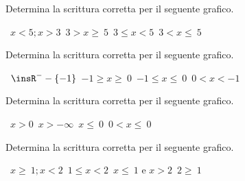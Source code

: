 \begin{esercizio}
 \label{ese:21.4}
 Determina la scrittura corretta per il seguente grafico.
  \begin{center}
  

  \boxA\quad~\(x<5;x>3\)\quad\boxB\quad~\(3>x\ge~5\)\quad\boxC\quad~\(3\le x<5\)\quad\boxD\quad~\(3<x\le~5\)
 \end{center}
  \end{esercizio}

\begin{esercizio}
 \label{ese:21.5}
Determina la scrittura corretta per il seguente grafico.
 \begin{center}
  

  \boxA\quad~\(\insR^{-}-\{-1\}\)\quad\boxB\quad~\(-1\ge x\ge~0\)\quad\boxC\quad~\(-1\le x\le~0\)\quad\boxD\quad~\(0<x<-1\)
 \end{center}
 \end{esercizio}

\begin{esercizio}
 \label{ese:21.6}
Determina la scrittura corretta per il seguente grafico.
 \begin{center}
  

  \boxA\quad~\(x>0\)\quad\boxB\quad~\(x>-\infty \)\quad\boxC\quad~\(x\le~0\)\quad\boxD\quad~\(0<x\le~0\)
 \end{center}
  \end{esercizio}

\begin{esercizio}
 \label{ese:21.7}
Determina la scrittura corretta per il seguente grafico.
 \begin{center}
  

  \boxA\quad~\(x\ge~1;x<2\)\quad\boxB\quad~\(1\le x<2\)\quad\boxC\quad~\(x\le~1\text{ e }x>2\)\quad\boxD\quad~\(2\ge~1\)
 \end{center}
  \end{esercizio}

\subsubsection*{}

